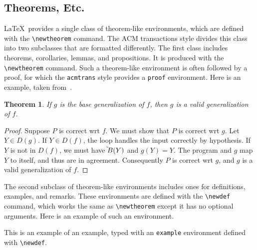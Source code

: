 \subsection{Theorems, Etc.}

\LaTeX\ provides a single class of theorem-like environments, which are
defined with the \verb|\newtheorem| command.  The ACM transactions
style divides this class into two subclasses that are formatted
differently.  The first class includes theorems, corollaries, lemmas,
and propositions.  It is produced with the \verb|\newtheorem| command.
Such a theorem-like environment is often followed by a proof, for which
the {\tt acmtrans} style provides a {\tt proof} environment.
Here is an example, taken from~\cite{7(1):137}.

\newtheorem{theorem}{Theorem}

\begin{theorem}
If $g$ is the base generalization of $f$, then $g$ is a valid
generalization of $f$.
\end{theorem}
\begin{proof}
Suppose $P$ is correct wrt $f$.  We must show that $P$ is correct
wrt $g$.  Let $Y\in D(g)$.  If $Y\in D(f)$, the loop handles the input
correctly by hypothesis.  If $Y$ is not in $D(f)$, we must have
$\tilde{\rule{0pt}{6pt}}B(Y)$ and $g(Y)=Y$.  The program and $g$ map
$Y$ to itself, and thus are in agreement.  Consequently $P$ is
correct wrt $g$, and $g$ is a valid generalization of $f$.
\end{proof}

The second subclass of theorem-like environments includes ones for
definitions, examples, and remarks.  These environments are defined
with the \verb|\newdef| command, which works the same as
\verb|\newtheorem| except it has no optional arguments.  Here
is an example of such an environment.



\begin{example}
This is an example of an example, typed with an {\tt example}
environment defined with \verb|\newdef|.
\end{example}


\newtheorem{property}{Property}


